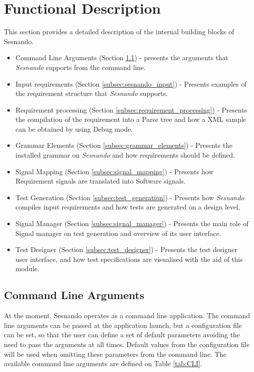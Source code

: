 \section{Functional Description}
\label{sec:functional_description}

This section provides a detailed description of the internal building blocks of Sesnando.

\begin{itemize}
\item Command Line Arguments (Section \ref{subsec:command_line_arguments}) - presents the arguments that \textit{Sesnando} supports from the command line.
\item Input requirements (Section \ref{subsec:sesnando_input}) - Presents examples of the requirement structure that \textit{Sesnando} supports.
\item Requirement processing (Section \ref{subsec:requirement_processing}) - Presents the compilation of the requirement into a Parse tree and how a XML sample can be obtained by using Debug mode.
\item Grammar Elements (Section \ref{subsec:grammar_elements}) - Presents the installed grammar on \textit{Sesnando} and how requirements should be defined.
\item Signal Mapping (Section \ref{subsec:signal_mapping}) - Presents how Requirement signals are translated into Software signals.
\item Test Generation (Section \ref{subsec:test_generation}) - Presents how \textit{Sesnando} compiles input requirements and how tests are generated on a design level.
\item Signal Manager (Section \ref{subsec:signal_manager}) - Presents the main role of Signal manager on test generation and overview of its user interface.
\item Test Designer (Section \ref{subsec:test_designer}) - Presents the test designer user interface, and how test specifications are visualised with the aid of this module.
\end{itemize}


\subsection{Command Line Arguments}
\label{subsec:command_line_arguments}

At the moment, Sesnando operates as a command line application. The command line arguments can be passed at the application launch, but a configuration file can be set, so that the user can define a set of default parameters avoiding the need to pass the arguments at all times. Default values from the configuration file will be used when omitting these parameters from the command line. The available command line arguments are defined on Table \ref{tab:CLI}.

